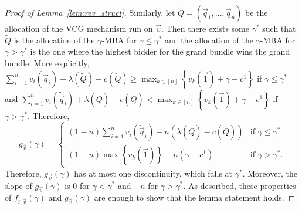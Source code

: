\begin{proof}[Proof of Lemma~\ref{lem:rev_struct}]
Similarly, let $\tilde{Q} = \left(\tilde{\vec{q}}_1, \dots, \tilde{\vec{q}}_n\right)$ be the allocation of the VCG mechanism run on $\vec{v}$. Then there exists some $\gamma^*$ such that $\tilde{Q}$ is the allocation of the $\gamma$-MBA for $\gamma \leq \gamma^*$ and the allocation of the $\gamma$-MBA for $\gamma > \gamma^*$ is the one where the highest bidder for the grand bundle wins the grand bundle. More explicitly, $\sum_{i=1}^n v_i\left(\tilde{\vec{q}}_i\right) + \lambda\left(\tilde{Q}\right) - c\left(\tilde{Q}\right) \geq \max_{k \in [n]}\left\{v_k\left(\vec{1}\right) + \gamma - c^1\right\}$ if $\gamma \leq \gamma^*$ and
$\sum_{i=1}^n v_i\left(\tilde{\vec{q}}_i\right) + \lambda\left(\tilde{Q}\right) - c\left(\tilde{Q}\right) < \max_{k \in [n]}\left\{v_k\left(\vec{1}\right) + \gamma - c^1\right\}$ if $\gamma > \gamma^*$. Therefore, \[g_{\vec{v}}(\gamma) = \begin{cases} (1-n)\sum_{i=1}^n v_i\left(\tilde{\vec{q}}_i\right) - n\left(\lambda\left(\tilde{Q}\right) - c\left(\tilde{Q}\right)\right) & \text{if } \gamma \leq \gamma^*\\ (1-n)\max \left\{v_k\left(\vec{1}\right)\right\} - n\left(\gamma - c^1\right) &\text{if } \gamma > \gamma^*.\end{cases}\] Therefore, $g_{\vec{v}}(\gamma)$ has at most one discontinuity, which falls at $\gamma^*$. Moreover, the slope of $g_{\vec{v}}(\gamma)$ is 0 for $\gamma < \gamma^*$ and $-n$ for $\gamma > \gamma^*$. As described, these properties of $f_{i,\vec{v}}(\gamma)$ and $g_{\vec{v}}(\gamma)$ are enough to show that the lemma statement holds.
\end{proof}
